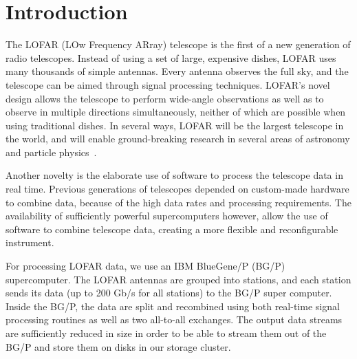 \documentclass{llncs}
\begin{document}
\section{Introduction}



The LOFAR (LOw Frequency ARray) telescope is the first of a new generation of radio telescopes. Instead of using a set of large, expensive dishes, LOFAR uses many thousands of simple antennas. Every antenna observes the full sky, and the telescope can be aimed through signal processing techniques. LOFAR's novel design allows the telescope to perform wide-angle observations as well as to observe in multiple directions simultaneously, neither of which are possible when using traditional dishes. In several ways, LOFAR will be the largest telescope in the world, and will enable ground-breaking research in several areas of astronomy and particle physics~\cite{Bruyn:02}.

Another novelty is the elaborate use of software to process the telescope data in real time. Previous generations of telescopes depended on custom-made hardware to combine data, because of the high data rates and processing requirements. The availability of sufficiently powerful supercomputers however, allow the use of software to combine telescope data, creating a more flexible and reconfigurable instrument.

For processing LOFAR data, we use an IBM BlueGene/P (BG/P) supercomputer. The LOFAR antennas are grouped into stations, and each station sends its data (up to 200 Gb/s for all stations) to the BG/P super computer. Inside the BG/P, the data are split and recombined using both real-time signal processing routines as well as two all-to-all exchanges. The output data streams are sufficiently reduced in size in order to be able to stream them out of the BG/P and store them on disks in our storage cluster.
\end{document}
